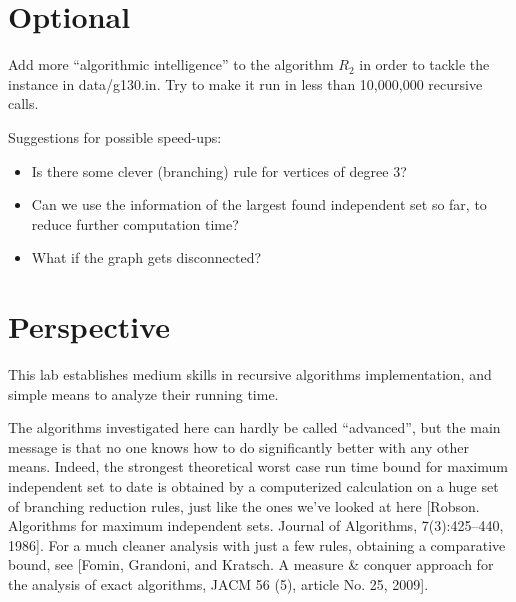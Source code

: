 \documentclass{tufte-handout}
\begin{document}
\section{Optional}
Add more ``algorithmic intelligence'' to the algorithm $R_2$ in order to tackle the instance in data/g130.in.
Try to make it run in less than 10,000,000 recursive calls. 

Suggestions for possible speed-ups:
\begin{itemize}
\item Is there some clever (branching) rule for vertices of degree 3?
\item Can we use the information of the largest found independent set so far, to reduce further computation time?
\item What if the graph gets disconnected?
\end{itemize}

\newpage
\section{ Perspective}

This lab establishes medium skills in recursive algorithms implementation,
and simple means to analyze their running time.

\bigskip

The algorithms investigated here can hardly be called ``advanced'', but the main message 
is that no one knows how to do significantly better with any other means.
Indeed, the strongest theoretical worst case run time bound for maximum independent set to date
is obtained by a computerized calculation on a huge set of branching reduction rules, just like the ones we've looked at here [Robson. Algorithms for maximum independent sets. Journal of Algorithms, 7(3):425--440, 1986]. For a much cleaner analysis with just a few rules, obtaining a comparative bound, see [Fomin, Grandoni, and Kratsch. A measure \& conquer approach for the analysis of exact algorithms, JACM 56 (5), article No. 25, 2009].
\end{document}
